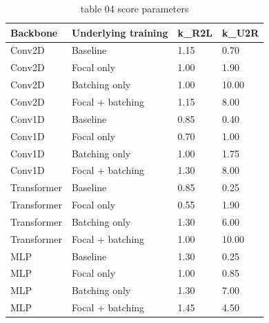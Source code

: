 \begin{table}[t]
\centering
\caption{table 04 score parameters}
\label{tab:score_parameters}
\begin{tabular}{llll}
\hline
Backbone & Underlying training & k\_R2L & k\_U2R \\
\hline
Conv2D & Baseline & 1.15 & 0.70 \\
Conv2D & Focal only & 1.00 & 1.90 \\
Conv2D & Batching only & 1.00 & 10.00 \\
Conv2D & Focal + batching & 1.15 & 8.00 \\
Conv1D & Baseline & 0.85 & 0.40 \\
Conv1D & Focal only & 0.70 & 1.00 \\
Conv1D & Batching only & 1.00 & 1.75 \\
Conv1D & Focal + batching & 1.30 & 8.00 \\
Transformer & Baseline & 0.85 & 0.25 \\
Transformer & Focal only & 0.55 & 1.90 \\
Transformer & Batching only & 1.30 & 6.00 \\
Transformer & Focal + batching & 1.00 & 10.00 \\
MLP & Baseline & 1.30 & 0.25 \\
MLP & Focal only & 1.00 & 0.85 \\
MLP & Batching only & 1.30 & 7.00 \\
MLP & Focal + batching & 1.45 & 4.50 \\
\hline
\end{tabular}
\end{table}
